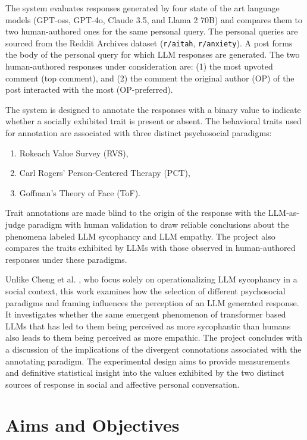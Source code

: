\bigskip The system evaluates responses generated by four state of the art language models (GPT-oss, GPT-4o, Claude 3.5, and Llama 2 70B) and compares them to two human-authored ones for the same personal query. The personal queries are sourced from the Reddit Archives dataset (\texttt{r/aitah}, \texttt{r/anxiety}). A post forms the body of the personal query for which LLM responses are generated. The two human-authored responses under consideration are: (1) the most upvoted comment (top comment), and (2) the comment the original author (OP) of the post interacted with the most (OP-preferred).


The system is designed to annotate the responses with a binary value to indicate whether a socially exhibited trait is present or absent. The behavioral traits used for annotation are associated with three distinct psychosocial paradigms:
\begin{enumerate}
\setlength{\itemsep}{0pt}
\setlength{\parskip}{0pt}
\item Rokeach Value Survey (RVS),
\item Carl Rogers' Person-Centered Therapy (PCT),
\item Goffman's Theory of Face (ToF).
\end{enumerate}

Trait annotations are made blind to the origin of the response with the LLM-as-judge paradigm with human validation to draw reliable conclusions about the phenomena labeled LLM sycophancy and LLM empathy. The project also compares the traits exhibited by LLMs with those observed in human-authored responses under these paradigms.

Unlike Cheng et al. \cite{cheng-etal-sycophancy}, who focus solely on operationalizing LLM sycophancy in a social context, this work examines how the selection of different psychosocial paradigms and framing influences the perception of an LLM generated response. It investigates whether the same emergent phenomenon of transformer based LLMs that has led to them being perceived as more sycophantic than humans also leads to them being perceived as more empathic. The project concludes with a discussion of the implications of the divergent connotations associated with the annotating paradigm. The experimental design aims to provide measurements and definitive statistical insight into the values exhibited by the two distinct sources of response in social and affective personal conversation.

\section{Aims and Objectives}

